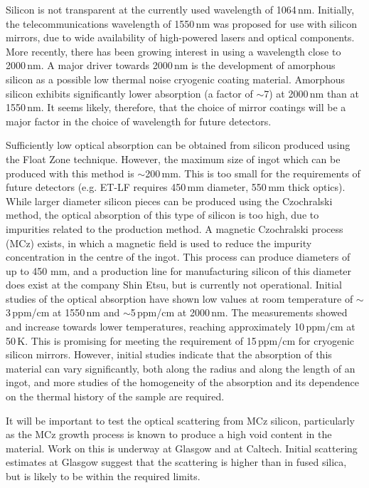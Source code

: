 Silicon is not transparent at the currently used wavelength of 1064\,nm. Initially, the telecommunications wavelength of 1550\,nm was proposed for use with silicon mirrors, due to wide availability of high-powered lasers and optical components. More recently, there has been growing interest in using a wavelength close to 2000\,nm. A major driver towards 2000\,nm is the development of amorphous silicon as a possible low thermal noise cryogenic coating material. Amorphous silicon exhibits significantly lower absorption (a factor of $\sim$7) at 2000\,nm than at 1550\,nm. It seems likely, therefore, that the choice of mirror coatings will be a major factor in the choice of wavelength for future detectors. 

Sufficiently low optical absorption can be obtained from silicon produced using the Float Zone technique. However, the maximum size of ingot which can be produced with this method is $\sim$200\,mm. This is too small for the requirements of future detectors (e.g. ET-LF requires 450\,mm diameter, 550\,mm thick optics). While larger diameter silicon pieces can be produced using the Czochralski method, the optical absorption of this type of silicon is too high, due to impurities related to the production method. A magnetic Czochralski process (MCz) exists, in which a magnetic field is used to reduce the impurity concentration in the centre of the ingot. This process can produce diameters of up to 450 mm, and a production line for manufacturing silicon of this diameter does exist at the company Shin Etsu, but is currently not operational. Initial studies of the optical absorption have shown low values at room temperature of $\sim$3\,ppm/cm at 1550\,nm and $\sim$5\,ppm/cm at 2000\,nm. The measurements showed and increase towards lower temperatures, reaching approximately 10\,ppm/cm at 50\,K. This is promising for meeting the requirement of 15\,ppm/cm for cryogenic silicon mirrors. However, initial studies indicate that the absorption of this material can vary significantly, both along the radius and along the length of an ingot, and more studies of the homogeneity of the absorption and its dependence on the thermal history of the sample are required. 

It will be important to test the optical scattering from MCz silicon, particularly as the MCz growth process is known to produce a high void content in the material. Work on this is underway at Glasgow and at Caltech. Initial scattering estimates at Glasgow \cite{SiliconScatter2017} suggest that the scattering is higher than in fused silica, but is likely to be within the required limits.

